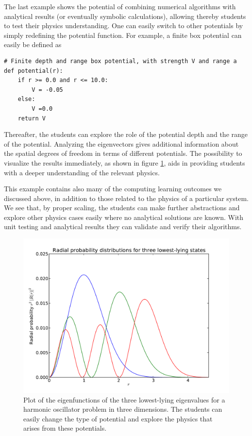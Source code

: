 \documentclass[graybox,envcountchap,sectrefs]{svmult}
\begin{document}
The last example shows the potential of combining numerical algorithms with analytical results (or eventually symbolic calculations), allowing thereby students to test their physics understanding. One can easily switch to other potentials by simply redefining the potential function. For example, a finite box potential can easily be defined as
\begin{lstlisting}
# Finite depth and range box potential, with strength V and range a
def potential(r):
    if r >= 0.0 and r <= 10.0:
        V = -0.05
    else:
        V =0.0
    return V
\end{lstlisting}
Thereafter, the students can explore the role of the potential depth
and the range of the potential. Analyzing the eigenvectors gives
additional information about the spatial degrees of freedom in terms
of different potentials.  The possibility to visualize the results immediately, as shown in figure \ref{fig:eigenvector}, aids in providing students with a deeper understanding of the relevant physics.

This example contains also many of the
computing learning outcomes we discussed above, in addition to those
related to the physics of a particular system. We see that, by proper
scaling, the students can make further abstractions and explore other
physics cases easily where no analytical solutions are known. With
unit testing and analytical results they can validate and verify their
algorithms.
\begin{figure}
\includegraphics[scale=0.8]{Figures/eigenvector.pdf}
\caption{Plot of the eigenfunctions of the three lowest-lying eigenvalues for a harmonic oscillator problem in three dimensions. The students can easily change the type of potential and explore the physics that arises from these potentials.}\label{fig:eigenvector}
\end{figure}
\end{document}
